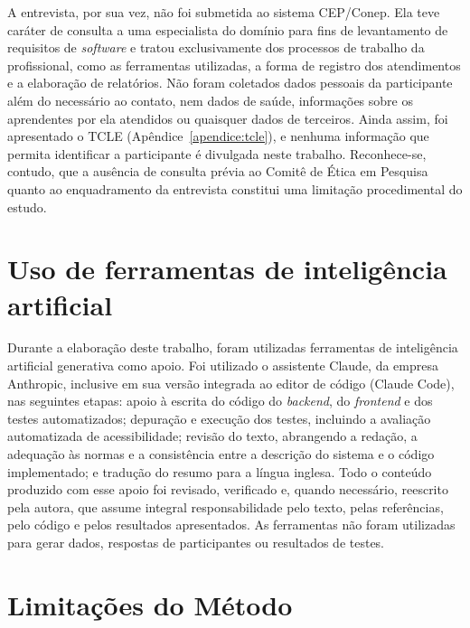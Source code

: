 A entrevista, por sua vez, não foi submetida ao sistema CEP/Conep. Ela teve caráter de consulta a uma especialista do domínio para fins de levantamento de requisitos de \textit{software} e tratou exclusivamente dos processos de trabalho da profissional, como as ferramentas utilizadas, a forma de registro dos atendimentos e a elaboração de relatórios. Não foram coletados dados pessoais da participante além do necessário ao contato, nem dados de saúde, informações sobre os aprendentes por ela atendidos ou quaisquer dados de terceiros. Ainda assim, foi apresentado o TCLE (Apêndice~\ref{apendice:tcle}), e nenhuma informação que permita identificar a participante é divulgada neste trabalho. Reconhece-se, contudo, que a ausência de consulta prévia ao Comitê de Ética em Pesquisa quanto ao enquadramento da entrevista constitui uma limitação procedimental do estudo.

\section{Uso de ferramentas de inteligência artificial}\label{sec:uso_ia}

Durante a elaboração deste trabalho, foram utilizadas ferramentas de inteligência artificial generativa como apoio. Foi utilizado o assistente Claude, da empresa Anthropic, inclusive em sua versão integrada ao editor de código (Claude Code), nas seguintes etapas: apoio à escrita do código do \textit{backend}, do \textit{frontend} e dos testes automatizados; depuração e execução dos testes, incluindo a avaliação automatizada de acessibilidade; revisão do texto, abrangendo a redação, a adequação às normas e a consistência entre a descrição do sistema e o código implementado; e tradução do resumo para a língua inglesa. Todo o conteúdo produzido com esse apoio foi revisado, verificado e, quando necessário, reescrito pela autora, que assume integral responsabilidade pelo texto, pelas referências, pelo código e pelos resultados apresentados. As ferramentas não foram utilizadas para gerar dados, respostas de participantes ou resultados de testes.

\section{Limitações do Método}

